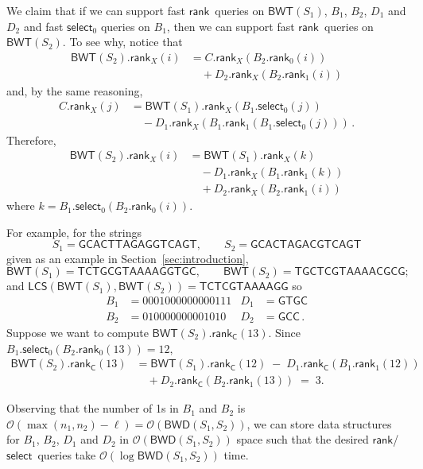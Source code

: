\documentclass{llncs}
\newcommand{\Oh}[1]
  {\ensuremath{\mathcal{O}\!\left( {#1} \right)}}
\newcommand{\LCS}
  {\ensuremath{\mathsf{LCS}}}
\newcommand{\BWD}
  {\ensuremath{\mathsf{BWD}}}
\newcommand{\BWT}
  {\ensuremath{\mathsf{BWT}}}
\newcommand{\rank}
  {\ensuremath{\mathsf{rank}}}
\newcommand{\select}
  {\ensuremath{\mathsf{select}}}
\begin{document}
We claim that if we can support fast \rank\ queries on \(\BWT (S_1)\), $B_1$,
$B_2$, $D_1$ and $D_2$ and fast $\select_0$ queries on $B_1$, then we can
support fast \rank\ queries on \(\BWT (S_2)\). To see why, notice that
\begin{align*}
\BWT (S_2).\rank_X (i)
& = C.\rank_X (B_2.\rank_0 (i))\\
& \quad + D_2.\rank_X (B_2.\rank_1 (i))
\end{align*}
and, by the same reasoning,
\begin{align*}
C.\rank_X (j)
& = \BWT (S_1).\rank_X (B_1.\select_0 (j))\\
& \quad - D_1.\rank_X (B_1.\rank_1 (B_1.\select_0 (j)))\,.
\end{align*}
Therefore,
\begin{align*}
\BWT (S_2).\rank_X (i)
& = \BWT (S_1).\rank_X (k)\\
& \quad - D_1.\rank_X (B_1.\rank_1 (k))\\
& \quad + D_2.\rank_X (B_2.\rank_1 (i))
\end{align*}
where \(k = B_1.\select_0 (B_2.\rank_0 (i))\).


For example, for the strings
$$
S_1 = \mathsf{GCACTTAGAGGTCAGT},\qquad
S_2 = \mathsf{GCACTAGACGTCAGT}
$$
given as an example in Section~\ref{sec:introduction},
$$
\BWT (S_1) = \mathsf{TCTGCGTAAAAGGTGC},\qquad
\BWT (S_2) = \mathsf{TGCTCGTAAAACGCG};
$$
and $\LCS(\BWT (S_1),\BWT (S_2)) = \mathsf{TCTCGTAAAAGG}$ so
\begin{align*}
B_1  & = 0001000000000111  & D_1  &= \mathsf{GTGC}\\
B_2  & = 010000000001010   & D_2  & = \mathsf{GCC}\,.
\end{align*}
Suppose we want to compute $\BWT (S_2).\rank_\mathsf{C} (13)$. Since \(B_1.\select_0 (B_2.\rank_0 (13)) = 12\),
\begin{align*}
\BWT (S_2).\rank_\mathsf{C} (13)
& = \BWT (S_1).\rank_\mathsf{C} (12)\; -\; D_1.\rank_\mathsf{C} (B_1.\rank_1 (12))
\\
& \quad + D_2.\rank_\mathsf{C} (B_2.\rank_1 (13)) \;=\; 3.
\end{align*}

Observing that the number of 1s in $B_1$ and $B_2$ is \(\Oh{\max (n_1, n_2) -
\ell} = \Oh{\BWD (S_1, S_2)}\), we can store data structures for $B_1$,
$B_2$, $D_1$ and $D_2$ in $\Oh{\BWD (S_1, S_2)}$ space such that the desired
\rank/\select\ queries take $\Oh{\log \BWD (S_1, S_2)}$ time.
\end{document}
